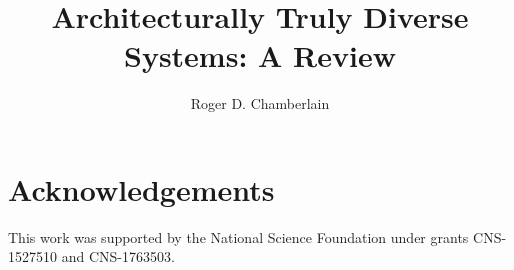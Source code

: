 \documentclass[preprint,11pt]{elsarticle}
\begin{document}
\begin{frontmatter}
\title{Architecturally Truly Diverse Systems: A Review}

\author{Roger D. Chamberlain}
\address{Washington University in St. Louis, St. Louis, Missouri, USA}

\end{frontmatter}








\section*{Acknowledgements}
This work was supported by the National Science Foundation under grants CNS-1527510 and CNS-1763503.




\end{document}
